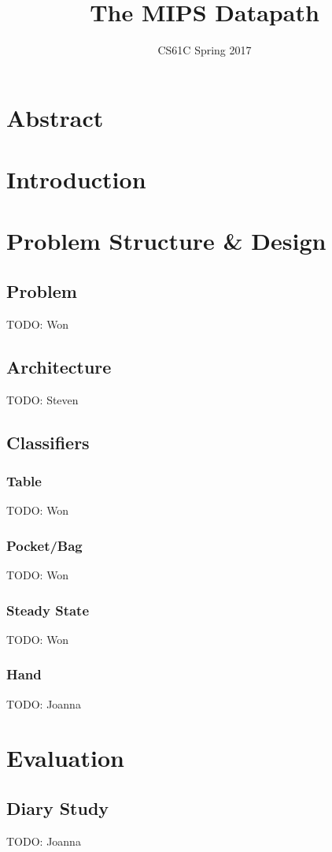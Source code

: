\documentclass{article}
\title{The MIPS Datapath}
\author{CS61C Spring 2017}
\date{ }
\begin{document}
\maketitle
\tableofcontents
\newpage

\section{Abstract}
\section{Introduction}

\section{Problem Structure \& Design}
\subsection{Problem}
TODO: Won
\subsection{Architecture}
TODO: Steven
\subsection{Classifiers}
\subsubsection{Table}
TODO: Won
\subsubsection{Pocket/Bag}
TODO: Won
\subsubsection{Steady State}
TODO: Won
\subsubsection{Hand}
TODO: Joanna

\section{Evaluation}
\subsection{Diary Study}
TODO: Joanna
\end{document}

